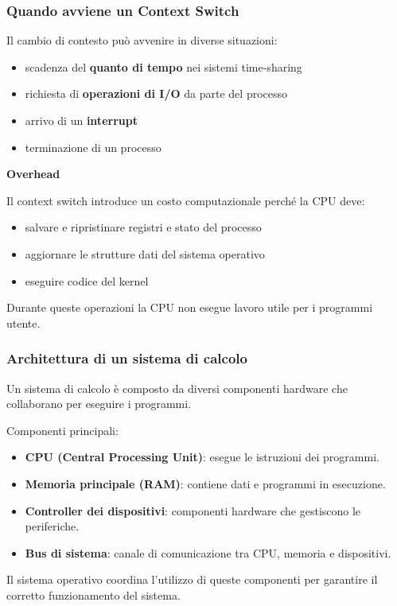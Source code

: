 \documentclass{beamer}
\begin{document}
\begin{frame}
	\frametitle{Quando avviene un Context Switch}
	
	Il cambio di contesto può avvenire in diverse situazioni:
	
	\begin{itemize}
		
		\item scadenza del \textbf{quanto di tempo} nei sistemi time-sharing
		
		\item richiesta di \textbf{operazioni di I/O} da parte del processo
		
		\item arrivo di un \textbf{interrupt}
		
		\item terminazione di un processo
		
	\end{itemize}
	
	\textbf{Overhead}
	
	Il context switch introduce un costo computazionale
	perché la CPU deve:
	
	\begin{itemize}
		
		\item salvare e ripristinare registri e stato del processo
		\item aggiornare le strutture dati del sistema operativo
		\item eseguire codice del kernel
		
	\end{itemize}
	
	Durante queste operazioni la CPU non esegue lavoro utile
	per i programmi utente.
	
\end{frame}

	


\begin{frame}
	\frametitle{Architettura di un sistema di calcolo}
	
	Un sistema di calcolo è composto da diversi componenti hardware
	che collaborano per eseguire i programmi.
	
	Componenti principali:
	
	\begin{itemize}
		\item \textbf{CPU (Central Processing Unit)}: esegue le istruzioni dei programmi.
		\item \textbf{Memoria principale (RAM)}: contiene dati e programmi in esecuzione.
		\item \textbf{Controller dei dispositivi}: componenti hardware che gestiscono le periferiche.
		\item \textbf{Bus di sistema}: canale di comunicazione tra CPU, memoria e dispositivi.
	\end{itemize}
	
	Il sistema operativo coordina l'utilizzo di queste componenti
	per garantire il corretto funzionamento del sistema.
	
\end{frame}
\end{document}
